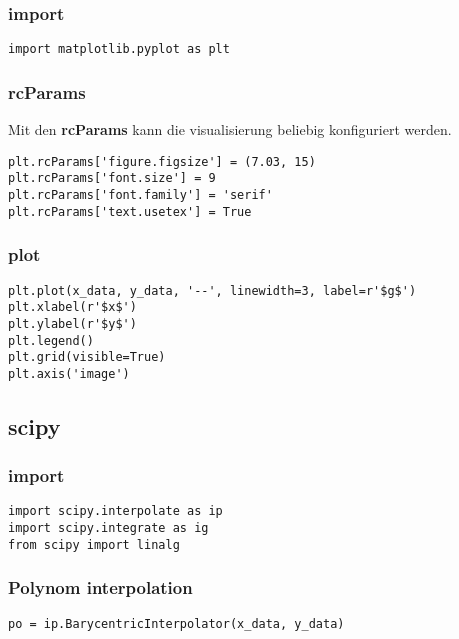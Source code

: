 \subsubsection{import}

\begin{verbatim}
import matplotlib.pyplot as plt
\end{verbatim}

\subsubsection{rcParams}

Mit den \textbf{rcParams} kann die visualisierung beliebig konfiguriert werden.

\begin{verbatim}
plt.rcParams['figure.figsize'] = (7.03, 15)
plt.rcParams['font.size'] = 9
plt.rcParams['font.family'] = 'serif'
plt.rcParams['text.usetex'] = True
\end{verbatim}

\subsubsection{plot}

\begin{verbatim}
plt.plot(x_data, y_data, '--', linewidth=3, label=r'$g$')
plt.xlabel(r'$x$')
plt.ylabel(r'$y$')
plt.legend()
plt.grid(visible=True)
plt.axis('image')
\end{verbatim}

\subsection{scipy}

\subsubsection{import}

\begin{verbatim}
import scipy.interpolate as ip
import scipy.integrate as ig
from scipy import linalg
\end{verbatim}

\subsubsection{Polynom interpolation}

\begin{verbatim}
po = ip.BarycentricInterpolator(x_data, y_data)
\end{verbatim}

